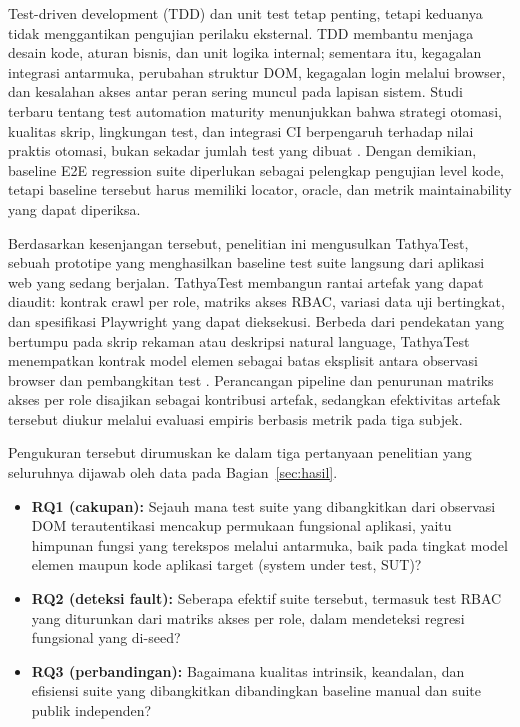 \documentclass[conference]{IEEEtran}
\begin{document}
Test-driven development (TDD) dan unit test tetap penting, tetapi keduanya tidak menggantikan pengujian perilaku eksternal. TDD membantu menjaga desain kode, aturan bisnis, dan unit logika internal; sementara itu, kegagalan integrasi antarmuka, perubahan struktur DOM, kegagalan login melalui browser, dan kesalahan akses antar peran sering muncul pada lapisan sistem. Studi terbaru tentang test automation maturity menunjukkan bahwa strategi otomasi, kualitas skrip, lingkungan test, dan integrasi CI berpengaruh terhadap nilai praktis otomasi, bukan sekadar jumlah test yang dibuat \cite{wang2022maturity,wang2022quality}. Dengan demikian, baseline E2E regression suite diperlukan sebagai pelengkap pengujian level kode, tetapi baseline tersebut harus memiliki locator, oracle, dan metrik maintainability yang dapat diperiksa.

Berdasarkan kesenjangan tersebut, penelitian ini mengusulkan TathyaTest, sebuah prototipe yang menghasilkan baseline test suite langsung dari aplikasi web yang sedang berjalan. TathyaTest membangun rantai artefak yang dapat diaudit: kontrak crawl per role, matriks akses RBAC, variasi data uji bertingkat, dan spesifikasi Playwright yang dapat dieksekusi. Berbeda dari pendekatan yang bertumpu pada skrip rekaman atau deskripsi natural language, TathyaTest menempatkan kontrak model elemen sebagai batas eksplisit antara observasi browser dan pembangkitan test \cite{sunman2022automated,alian2024autoe2e,junior2025genia}. Perancangan pipeline dan penurunan matriks akses per role disajikan sebagai kontribusi artefak, sedangkan efektivitas artefak tersebut diukur melalui evaluasi empiris berbasis metrik pada tiga subjek.

Pengukuran tersebut dirumuskan ke dalam tiga pertanyaan penelitian yang seluruhnya dijawab oleh data pada Bagian~\ref{sec:hasil}.

\begin{itemize}
    \item \textbf{RQ1 (cakupan):} Sejauh mana test suite yang dibangkitkan dari observasi DOM terautentikasi mencakup permukaan fungsional aplikasi, yaitu himpunan fungsi yang terekspos melalui antarmuka, baik pada tingkat model elemen maupun kode aplikasi target (system under test, SUT)?
    \item \textbf{RQ2 (deteksi fault):} Seberapa efektif suite tersebut, termasuk test RBAC yang diturunkan dari matriks akses per role, dalam mendeteksi regresi fungsional yang di-seed?
    \item \textbf{RQ3 (perbandingan):} Bagaimana kualitas intrinsik, keandalan, dan efisiensi suite yang dibangkitkan dibandingkan baseline manual dan suite publik independen?
\end{itemize}
\end{document}
